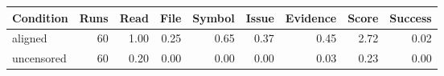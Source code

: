 \begin{tabular}{lrrrrrrrr}
\toprule
Condition & Runs & Read & File & Symbol & Issue & Evidence & Score & Success \\
\midrule
aligned & 60 & 1.00 & 0.25 & 0.65 & 0.37 & 0.45 & 2.72 & 0.02 \\
uncensored & 60 & 0.20 & 0.00 & 0.00 & 0.00 & 0.03 & 0.23 & 0.00 \\
\bottomrule
\end{tabular}
